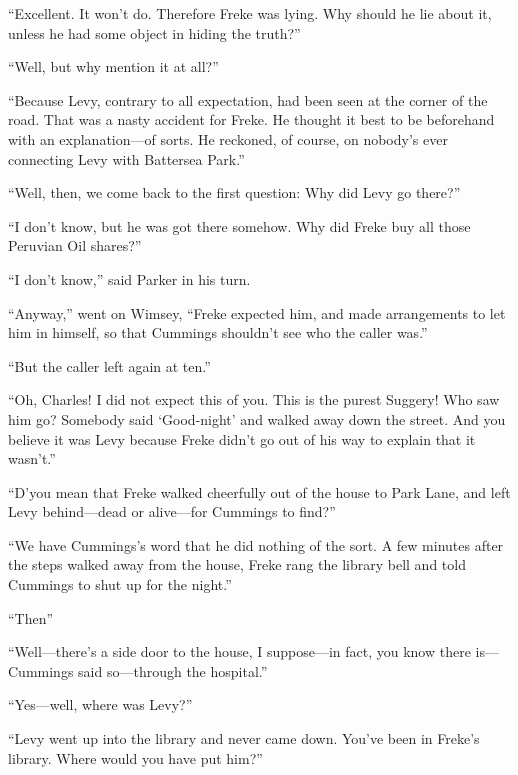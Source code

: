\enquote{Excellent. It won’t do. Therefore Freke was lying. Why should he lie about it, unless he had some object in hiding the truth?}

\enquote{Well, but why mention it at all?}

\enquote{Because Levy, contrary to all expectation, had been seen at the corner of the road. That was a nasty accident for Freke. He thought it best to be beforehand with an explanation\allowbreak---\allowbreak of sorts. He reckoned, of course, on nobody’s ever connecting Levy with Battersea Park.}

\enquote{Well, then, we come back to the first question: Why did Levy go there?}

\enquote{I don’t know, but he was got there somehow. Why did Freke buy all those Peruvian Oil shares?}

\enquote{I don’t know,} said Parker in his turn.

\enquote{Anyway,} went on Wimsey, \enquote{Freke expected him, and made arrangements to let him in himself, so that Cummings shouldn’t see who the caller was.}

\enquote{But the caller left again at ten.}

\enquote{Oh, Charles! I did not expect this of you. This is the purest Suggery! Who saw him go? Somebody said \enquote{Good-night} and walked away down the street. And you believe it was Levy because Freke didn’t go out of his way to explain that it wasn’t.}

\enquote{D’you mean that Freke walked cheerfully out of the house to Park Lane, and left Levy behind\allowbreak---\allowbreak dead or alive\allowbreak---\allowbreak for Cummings to find?}

\enquote{We have Cummings’s word that he did nothing of the sort. A few minutes after the steps walked away from the house, Freke rang the library bell and told Cummings to shut up for the night.}

\enquote{Then\longdash}

\enquote{Well\allowbreak---\allowbreak there’s a side door to the house, I suppose\allowbreak---\allowbreak in fact, you know there is\allowbreak---\allowbreak Cummings said so\allowbreak---\allowbreak through the hospital.}

\enquote{Yes\allowbreak---\allowbreak well, where was Levy?}

\enquote{Levy went up into the library and never came down. You’ve been in Freke’s library. Where would you have put him?}

